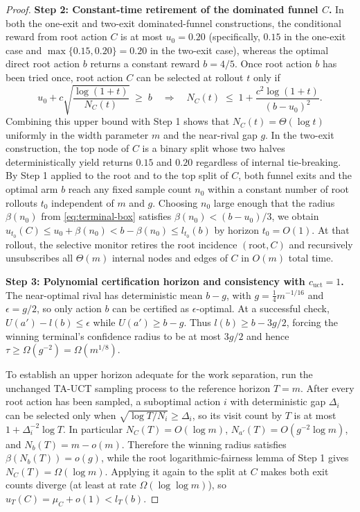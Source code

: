 \documentclass{article}
\theoremstyle{plain}
\theoremstyle{definition}
\begin{document}
\begin{proof}
\medskip\noindent\textbf{Step 2: Constant-time retirement of the dominated funnel $C$.}
In both the one-exit and two-exit dominated-funnel constructions, the conditional reward from root action $C$ is at most $u_0=0.20$ (specifically, $0.15$ in the one-exit case and $\max\{0.15,0.20\}=0.20$ in the two-exit case), whereas the optimal direct root action $b$ returns a constant reward $b = 4/5$. Once root action $b$ has been tried once, root action $C$ can be selected at rollout $t$ only if
\[
u_0 + c\sqrt{\frac{\log(1+t)}{N_C(t)}} \;\ge\; b \quad\Longrightarrow\quad N_C(t) \;\le\; 1 + \frac{c^2 \log(1+t)}{(b - u_0)^2}.
\]
Combining this upper bound with Step 1 shows that $N_C(t) = \Theta(\log t)$ uniformly in the width parameter $m$ and the near-rival gap $g$. In the two-exit construction, the top node of $C$ is a binary split whose two halves deterministically yield returns $0.15$ and $0.20$ regardless of internal tie-breaking. By Step 1 applied to the root and to the top split of $C$, both funnel exits and the optimal arm $b$ reach any fixed sample count $n_0$ within a constant number of root rollouts $t_0$ independent of $m$ and $g$. Choosing $n_0$ large enough that the radius $\beta(n_0)$ from \eqref{eq:terminal-box} satisfies $\beta(n_0)<(b-u_0)/3$, we obtain $u_{t_0}(C)\le u_0+\beta(n_0)<b-\beta(n_0)\le l_{t_0}(b)$ by horizon $t_0 = O(1)$. At that rollout, the selective monitor retires the root incidence $(\text{root}, C)$ and recursively unsubscribes all $\Theta(m)$ internal nodes and edges of $C$ in $O(m)$ total time.

\medskip\noindent\textbf{Step 3: Polynomial certification horizon and consistency with $c_{\mathrm{uct}}=1$.}
The near-optimal rival has deterministic mean $b-g$, with $g=\tfrac14m^{-1/16}$ and $\epsilon=g/2$, so only action $b$ can be certified as $\epsilon$-optimal. At a successful check, $U(a')-l(b)\le\epsilon$ while $U(a')\ge b-g$. Thus $l(b)\ge b-3g/2$, forcing the winning terminal's confidence radius to be at most $3g/2$ and hence $\tau\ge\Omega(g^{-2})=\Omega(m^{1/8})$.

To establish an upper horizon adequate for the work separation, run the unchanged TA-UCT sampling process to the reference horizon $T=m$. After every root action has been sampled, a suboptimal action $i$ with deterministic gap $\Delta_i$ can be selected only when $\sqrt{\log T/N_i}\ge\Delta_i$, so its visit count by $T$ is at most $1+\Delta_i^{-2}\log T$. In particular $N_C(T)=O(\log m)$, $N_{a'}(T)=O(g^{-2}\log m)$, and $N_b(T)=m-o(m)$. Therefore the winning radius satisfies $\beta(N_b(T))=o(g)$, while the root logarithmic-fairness lemma of Step 1 gives $N_C(T)=\Omega(\log m)$. Applying it again to the split at $C$ makes both exit counts diverge (at least at rate $\Omega(\log\log m)$), so $u_T(C)=\mu_C+o(1)<l_T(b)$.


\end{proof}
\end{document}
